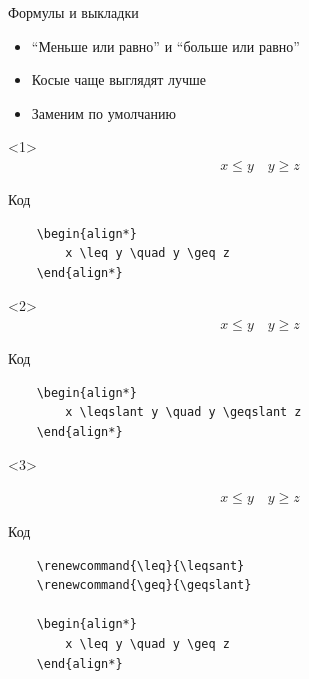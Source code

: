
\begin{frame}[fragile]{Формулы и выкладки}

\begin{itemize}[<+->]
    \item ``Меньше или равно'' и ``больше или равно''
    \item Косые чаще выглядят лучше
    \item Заменим по умолчанию
\end{itemize}

\begin{onlyenv}<1>
    \begin{align*}
        x \leq y \quad y \geq z
    \end{align*}

    \begin{block}{Код}
        \begin{lstlisting}
    \begin{align*}
        x \leq y \quad y \geq z
    \end{align*}
        \end{lstlisting}
    \end{block}
\end{onlyenv}

\begin{onlyenv}<2>
    \begin{align*}
        x \leqslant y \quad y \geqslant z
    \end{align*}
    
    \begin{block}{Код}
        \begin{lstlisting}
    \begin{align*}
        x \leqslant y \quad y \geqslant z
    \end{align*}
        \end{lstlisting}
    \end{block}
\end{onlyenv}

\begin{onlyenv}<3>
    {
        \renewcommand{\leq}{\leqslant}
        \renewcommand{\geq}{\geqslant}
        
        \begin{align*}
            x \leq y \quad y \geq z
        \end{align*}
    }
    
    \begin{block}{Код}
        \begin{lstlisting}
    \renewcommand{\leq}{\leqsant}
    \renewcommand{\geq}{\geqslant}
    
    \begin{align*}
        x \leq y \quad y \geq z
    \end{align*}
        \end{lstlisting}
    \end{block}
\end{onlyenv}

\end{frame}


